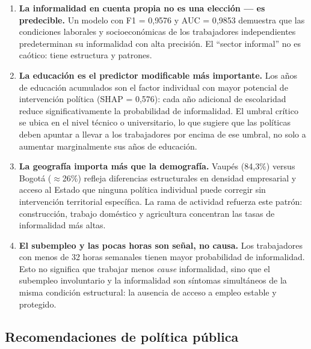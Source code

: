 \documentclass[12pt, a4paper]{article}
\begin{document}
\begin{enumerate}[label=\arabic*.]
  \item \textbf{La informalidad en cuenta propia no es una elección — es predecible.}
  Un modelo con F1 = 0{,}9576 y AUC = 0{,}9853 demuestra que las condiciones laborales
  y socioeconómicas de los trabajadores independientes predeterminan su informalidad
  con alta precisión. El ``sector informal'' no es caótico: tiene estructura y patrones.

  \item \textbf{La educación es el predictor modificable más importante.}
  Los años de educación acumulados son el factor individual con mayor potencial de
  intervención política (SHAP = 0{,}576): cada año adicional de escolaridad reduce
  significativamente la probabilidad de informalidad. El umbral crítico se ubica en
  el nivel técnico o universitario, lo que sugiere que las políticas deben apuntar
  a llevar a los trabajadores por encima de ese umbral, no solo a aumentar marginalmente
  sus años de educación.

  \item \textbf{La geografía importa más que la demografía.}
  Vaupés (84{,}3\%) versus Bogotá ($\approx$26\%) refleja diferencias estructurales
  en densidad empresarial y acceso al Estado que ninguna política individual puede
  corregir sin intervención territorial específica. La rama de actividad refuerza este
  patrón: construcción, trabajo doméstico y agricultura concentran las tasas de
  informalidad más altas.

  \item \textbf{El subempleo y las pocas horas son señal, no causa.}
  Los trabajadores con menos de 32 horas semanales tienen mayor probabilidad de
  informalidad. Esto no significa que trabajar menos \textit{cause} informalidad, sino
  que el subempleo involuntario y la informalidad son síntomas simultáneos de la
  misma condición estructural: la ausencia de acceso a empleo estable y protegido.
\end{enumerate}

\subsection{Recomendaciones de política pública}
\end{document}

